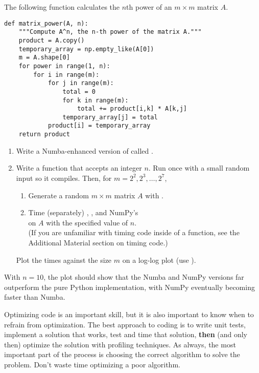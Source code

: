 \begin{problem} %
The following function calculates the $n$th power of an $m\times m$ matrix $A$.

\begin{lstlisting}
def matrix_power(A, n):
    """Compute A^n, the n-th power of the matrix A."""
    product = A.copy()
    temporary_array = np.empty_like(A[0])
    m = A.shape[0]
    for power in range(1, n):
        for i in range(m):
            for j in range(m):
                total = 0
                for k in range(m):
                    total += product[i,k] * A[k,j]
                temporary_array[j] = total
            product[i] = temporary_array
    return product
\end{lstlisting}

\begin{enumerate}
\item Write a Numba-enhanced version of  called .
\item Write a function that accepts an integer $n$.
Run  once with a small random input so it compiles.
Then, for $m=2^2,2^3,\ldots,2^7$,
    \begin{enumerate}
        \item Generate a random $m\times m$ matrix $A$ with .
        \item Time (separately) , , and NumPy's \\  on $A$ with the specified value of $n$.
        \\(If you are unfamiliar with timing code inside of a function, see the \\ Additional Material section on timing code.)
    \end{enumerate}
Plot the times against the size $m$ on a log-log plot (use ).
\end{enumerate}
With $n=10$, the plot should show that the Numba and NumPy versions far outperform the pure Python implementation, with NumPy eventually becoming faster than Numba.
\end{problem}

\begin{warn}
Optimizing code is an important skill, but it is also important to know when to refrain from optimization.
The best approach to coding is to write unit tests, implement a solution that works, test and time that solution, \textbf{then} (and only then) optimize the solution with profiling techniques.
As always, the most important part of the process is choosing the correct algorithm to solve the problem.
Don't waste time optimizing a poor algorithm.
\end{warn}

